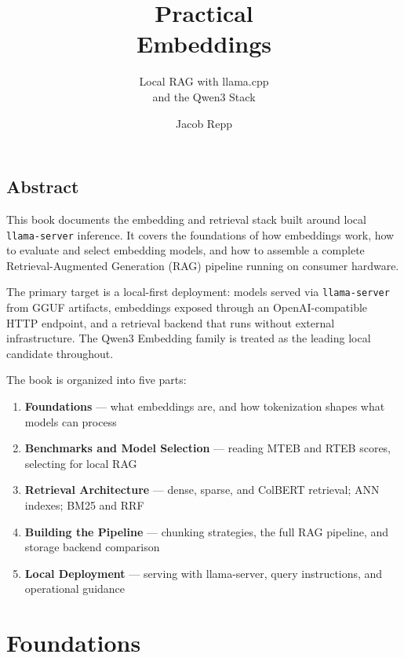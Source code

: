 \documentclass{professional-book}
\title{Practical\\Embeddings}
\subtitle{Local RAG with llama.cpp\\and the Qwen3 Stack}
\author{Jacob Repp}
\date{\bookdate}
\begin{document}
\maketitle


\frontmatter

\chapter*{Abstract}

This book documents the embedding and retrieval stack built around local \texttt{llama-server}
inference. It covers the foundations of how embeddings work, how to evaluate and select
embedding models, and how to assemble a complete Retrieval-Augmented Generation (RAG) pipeline
running on consumer hardware.

The primary target is a local-first deployment: models served via \texttt{llama-server} from
GGUF artifacts, embeddings exposed through an OpenAI-compatible HTTP endpoint, and a retrieval
backend that runs without external infrastructure. The Qwen3 Embedding family is treated as the
leading local candidate throughout.

The book is organized into five parts:

\begin{enumerate}
    \item \textbf{Foundations} --- what embeddings are, and how tokenization shapes what models can process
    \item \textbf{Benchmarks and Model Selection} --- reading MTEB and RTEB scores, selecting for local RAG
    \item \textbf{Retrieval Architecture} --- dense, sparse, and ColBERT retrieval; ANN indexes; BM25 and RRF
    \item \textbf{Building the Pipeline} --- chunking strategies, the full RAG pipeline, and storage backend comparison
    \item \textbf{Local Deployment} --- serving with llama-server, query instructions, and operational guidance
\end{enumerate}

\tableofcontents

\mainmatter

\part{Foundations}


\end{document}
